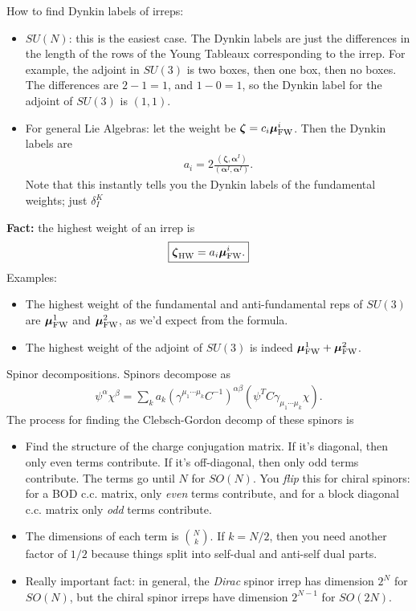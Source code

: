 \documentclass[11pt]{article}
\begin{document}
How to find Dynkin labels of irreps:
\begin{itemize}
    \item $SU(N)$: this is the easiest case. The Dynkin labels are just the
    differences in the length of the rows of the Young Tableaux corresponding to
    the irrep. For example, the adjoint in $SU(3)$ is two boxes, then one box,
    then no boxes. The differences are $2 - 1 = 1$, and $1 - 0 = 1$, so the Dynkin
    label for the adjoint of $SU(3)$ is $(1, 1)$.
    \item For general Lie Algebras: let the weight be $\boldsymbol{\zeta} = c_i \boldsymbol{\mu}_{\rm FW}^i$.
    Then the Dynkin labels are
    \begin{align*}
        \boxed{a_i = 2 \frac{(\boldsymbol{\zeta}, \boldsymbol{\alpha}^I)}{(\boldsymbol{\alpha}^I, \boldsymbol{\alpha}^I)}.}
    \end{align*}
    Note that this instantly tells you the Dynkin labels of the fundamental
    weights; just $\delta^K_I$
\end{itemize}

\textbf{Fact:} the highest weight of an irrep is
\begin{align*}
    \boxed{\boldsymbol{\zeta}_{\rm HW} = a_i \boldsymbol{\mu}^i_{\rm FW}.}
\end{align*}
Examples:
\begin{itemize}
    \item The highest weight of the fundamental and anti-fundamental reps
    of $SU(3)$ are $\boldsymbol{\mu}^1_{\rm FW}$ and $\boldsymbol{\mu}^2_{\rm FW}$, as
    we'd expect from the formula.
    \item The highest weight of the adjoint of $SU(3)$ is indeed $\boldsymbol{\mu}^1_{\rm FW}
    + \boldsymbol{\mu}^2_{\rm FW}$.
\end{itemize}

Spinor decompositions. Spinors decompose as
\begin{align*}
    \psi^\alpha \chi^\beta = \sum_k a_k (\gamma^{\mu_1 \cdots \mu_k} C^{-1})^{\alpha \beta} (\psi^T C \gamma_{\mu_1 \cdots \mu_k} \chi).
\end{align*}
The process for finding the Clebsch-Gordon decomp of these spinors is
\begin{itemize}
    \item Find the structure of the charge conjugation matrix. If it's
    diagonal, then only even terms contribute. If it's off-diagonal, then
    only odd terms contribute. The terms go until $N$ for $SO(N)$. You \emph{flip}
    this for chiral spinors: for a BOD c.c. matrix, only \emph{even} terms contribute,
    and for a block diagonal c.c. matrix only \emph{odd} terms contribute.
    \item The dimensions of each term is ${N \choose k}$. If $k = N/2$,
    then you need another factor of $1/2$ because things split into self-dual
    and anti-self dual parts.
    \item Really important fact: in general, the \emph{Dirac} spinor irrep
    has dimension $2^{N}$ for $SO(N)$, but the chiral spinor irreps have
    dimension $2^{N - 1}$ for $SO(2N)$.
\end{itemize}
\end{document}
